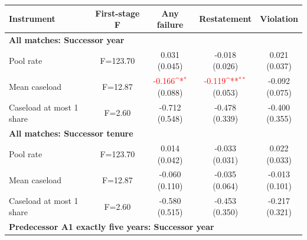 \documentclass[10pt]{article}
\newcommand{\sym}[1]{\textsuperscript{#1}}
\begin{document}
\begin{minipage}{19cm}\fontsize{10}{12}\selectfont\setlength{\tabcolsep}{4pt}\renewcommand{\arraystretch}{1.12}


\def\sym#1{\ifmmode^{#1}\else\(^{#1}\)\fi}
\centering
{}
\begin{threeparttable}
\begin{tabular}{p{}cccc}
\toprule
Instrument & First-stage F & Any failure & Restatement & Violation \\
\midrule
\multicolumn{5}{l}{\textbf{All matches: Successor year}} \\
Pool rate & F=123.70 & \shortstack{0.031\\(0.045)} & \shortstack{-0.018\\(0.026)} & \shortstack{0.021\\(0.037)} \\
Mean caseload & F=12.87 & \shortstack{\textcolor{red}{-0.166\sym{*}}\\(0.088)} & \shortstack{\textcolor{red}{-0.119\sym{**}}\\(0.053)} & \shortstack{-0.092\\(0.075)} \\
Caseload at most 1 share & F=2.60 & \shortstack{-0.712\\(0.548)} & \shortstack{-0.478\\(0.339)} & \shortstack{-0.400\\(0.355)} \\
\multicolumn{5}{l}{\textbf{All matches: Successor tenure}} \\
Pool rate & F=123.70 & \shortstack{0.014\\(0.042)} & \shortstack{-0.033\\(0.031)} & \shortstack{0.022\\(0.033)} \\
Mean caseload & F=12.87 & \shortstack{-0.060\\(0.110)} & \shortstack{-0.035\\(0.064)} & \shortstack{-0.013\\(0.101)} \\
Caseload at most 1 share & F=2.60 & \shortstack{-0.580\\(0.515)} & \shortstack{-0.453\\(0.350)} & \shortstack{-0.217\\(0.321)} \\
\multicolumn{5}{l}{\textbf{Predecessor A1 exactly five years: Successor year}} \\

\end{tabular}
\end{threeparttable}
\end{minipage}
\end{document}

